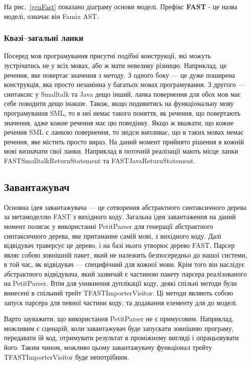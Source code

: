 \documentclass[12pt,a4paper]{article}
\begin{document}
На рис.~\ref{genFast} показано діаграму основи моделі. Префікс \textbf{FAST} - це назва моделі, означає він Famix AST.

\subsubsection{Квазі--загальні ланки}

Посеред мов програмування присутні подібні конструкції, які можуть зустрічатись не у всіх мовах, або ж мати невелику різницю. Наприклад, це речення, яке повертає значення з методу. З одного боку --- це дуже поширена конструкція, яка просто незамінна у багатьох мовах програмування. З другого --- синтаксис у Smalltalk та Java дещо інший, ланка повернення для обох мов має себе поводити дещо інакше. Також, якщо подивитись на функціональну мову програмування SML, то в неї немає такого поняття, як речення, що повертають значення, адже кожне речення має цю поведінку. Якщо ж вважати, що кожне речення SML є ланкою повернення, то звідси випливає, що в таких мовах немає речення, яке містить просто вираз. На даний момент прийнято рішення в кожній мові визначати свої ланки. Наприклад в поточній реалізації мають місце ланки FASTSmalltalkReturnStatement та FASTJavaReturnStatement.

\subsection{Завантажувач}

Основна ідея завантажувача --- це сотворення абстрактного синтаксичного дерева за метамоделлю FAST з вихідного коду. Загальна ідея завантаження на даний момент полягає у використанні PetitParser для генерації абстрактного синтаксичного дерева, яке притаманне самій мові, з вихідного коду. Далі відвідувач траверсує це дерево, і на базі нього утворює дерево FAST. Парсер являє собою зовнішній пакет, який не належить безпосередньо до нашої системи, в той час, як відвідувач --- специфічний для кожної мови. Крім того він наслідує абстрактного відвідувача, який зазвичай є частиною пакету парсера реалізованого на PetitParser. Втім для уникнення дуплікації коду, деякі спільні методи були винесені в спільний трейт TFASTImporterVisitor. Ці методи являють собою запуск парсера для певної частини коду, та додавання елементу для до моделі.

Варто зауважити, що використання PetitParser не є примусовим. Наприклад, можливим є сценарій, коли завантажувач буде запускати зовнішню програму, передавати їй код, отримувати результат в проміжному вигляді і опрацьовувати його. Таким чином, можливо цьому завантажувачу функціонал трейту TFASTImporterVisitor буде непотрібним.
\end{document}
